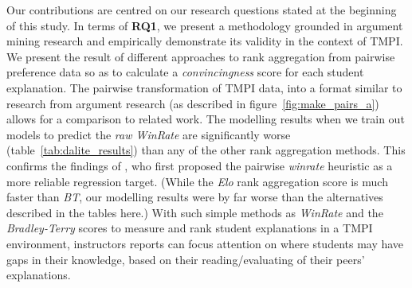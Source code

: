 \documentclass[notitlepage,12pt]{jedm}
\begin{document}
Our contributions are centred on our research questions stated at the beginning 
of this study. 
In terms of \textbf{RQ1}, we present a methodology grounded in argument mining 
research and empirically demonstrate its validity in the context of TMPI.
We present the result of different approaches to rank aggregation from pairwise 
preference data so as to calculate a \textit{convincingness} score for each 
student explanation.
The pairwise transformation of TMPI data, into a format similar to research 
from argument research (as described in figure~\ref{fig:make_pairs_a}) allows 
for a comparison to related work. 
The modelling results when we train out models to predict the \textit{raw 
WinRate} are significantly worse (table~\ref{tab:dalite_results}) than 
any of the other rank aggregation methods.
This confirms the findings of , who first proposed 
the pairwise \textit{winrate} heuristic as a more reliable regression 
target.
(While the \textit{Elo} rank aggregation score is much faster than \textit{BT}, 
our modelling results were by far worse than the alternatives described in the 
tables here.)
With such simple methods as \textit{WinRate} and the \textit{Bradley-Terry} 
scores to measure and rank student explanations in a TMPI environment, 
instructors reports can focus attention on where students may have 
gaps in their knowledge, based on their reading/evaluating of their peers' 
explanations.
\end{document}
